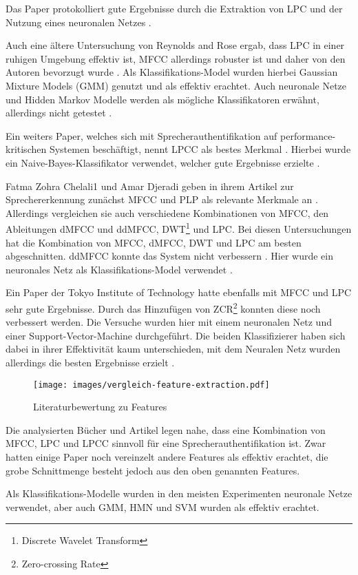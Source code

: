 Das Paper  protokolliert gute Ergebnisse durch die Extraktion von \ac{LPC} und der Nutzung eines neuronalen Netzes \autocite[vgl.][S. 9]{kumar_rajeev_multilingual_2009}.

Auch eine ältere Untersuchung von Reynolds and Rose ergab, dass \ac{LPC} in einer ruhigen Umgebung effektiv ist, \ac{MFCC} allerdings robuster ist und daher von den Autoren bevorzugt wurde \autocite[vgl.][S. 2f]{reynolds_robust_1995}.
Als Klassifikations-Model wurden hierbei Gaussian Mixture Models (GMM) genutzt und als effektiv erachtet.
Auch neuronale Netze und Hidden Markov Modelle werden als mögliche Klassifikatoren erwähnt, allerdings nicht getestet \autocite[vgl.][S. 2f, 11]{reynolds_robust_1995}.

Ein weiters Paper, welches sich mit Sprecherauthentifikation auf performance-kritischen Systemen beschäftigt, nennt \ac{LPCC} als bestes Merkmal \autocite[vgl.][S. 7]{thullier_text-independent_2017}.
Hierbei wurde ein Naive-Bayes-Klassifikator verwendet, welcher gute Ergebnisse erzielte \autocite[vgl.][S. 18f]{thullier_text-independent_2017}.

Fatma Zohra Chelali1 und Amar Djeradi geben in ihrem Artikel zur Sprechererkennung zunächst \ac{MFCC} und PLP als relevante Merkmale an \autocite[vgl.][S. 276]{chelali_text_2017}.
Allerdings vergleichen sie auch verschiedene Kombinationen von \ac{MFCC}, den Ableitungen \ac{dMFCC} und \ac{ddMFCC}, DWT\footnote{Discrete Wavelet Transform} und \ac{LPC}.
Bei diesen Untersuchungen hat die Kombination von \ac{MFCC}, \ac{dMFCC}, DWT und \ac{LPC} am besten abgeschnitten.
\ac{ddMFCC} konnte das System nicht verbessern \autocite[vgl.][S. 276, 739]{chelali_text_2017}.
Hier wurde ein neuronales Netz als Klassifikations-Model verwendet \autocite[vgl.][S. 735]{chelali_text_2017}.

Ein Paper der Tokyo Institute of Technology hatte ebenfalls mit \ac{MFCC} und \ac{LPC} sehr gute Ergebnisse.
Durch das Hinzufügen von ZCR\footnote{Zero-crossing Rate} konnten diese noch verbessert werden.
Die Versuche wurden hier mit einem neuronalen Netz und einer Support-Vector-Machine durchgeführt.
Die beiden Klassifizierer haben sich dabei in ihrer Effektivität kaum unterschieden, mit dem Neuralen Netz wurden allerdings die besten Ergebnisse erzielt \autocite[vgl.][S. 4]{neha_chauhan_2019_2019}.

\begin{figure}[H]
    \centering
    \texttt{[image: images/vergleich-feature-extraction.pdf]}
    \caption{Literaturbewertung zu Features}
    \label{fig:vergleichFeatureExtraction}
\end{figure}

Die analysierten Bücher und Artikel legen nahe, dass eine Kombination von \ac{MFCC}, \ac{LPC} und \ac{LPCC} sinnvoll für eine Sprecherauthentifikation ist.
Zwar hatten einige Paper noch vereinzelt andere Features als effektiv erachtet, die grobe Schnittmenge besteht jedoch aus den oben genannten Features.

Als Klassifikations-Modelle wurden in den meisten Experimenten neuronale Netze verwendet, aber auch GMM, HMN und SVM wurden als effektiv erachtet.

\textauthor{\vJB}{}{}